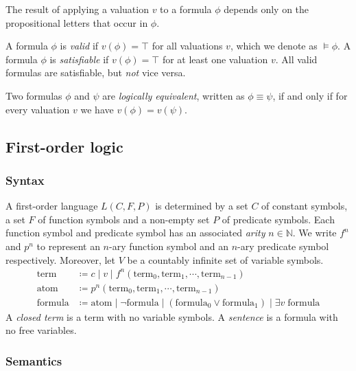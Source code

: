 The result of applying a valuation \(v\) to a formula \(\phi\) depends only on the propositional letters that occur in \(\phi\). 

A formula \(\phi\) is \emph{valid} if \(v(\phi) = \top\) for all valuations \(v\), which we denote as \(\models \phi\). A formula \(\phi\) is \emph{satisfiable} if \(v(\phi) = \top\) for at least one valuation \(v\). All valid formulas are satisfiable, but \emph{not} vice versa.

Two formulas \(\phi\) and \(\psi\) are \emph{logically equivalent}, written as \(\phi \equiv \psi\), if and only if for every valuation \(v\) we have \(v(\phi) = v(\psi)\).



\subsection{First-order logic}

\subsubsection{Syntax}

A first-order language \(L(C, F, P)\) is determined by a set \(C\) of constant symbols, a set \(F\) of function symbols and a non-empty set \(P\) of predicate symbols. Each function symbol and predicate symbol has an associated \emph{arity} \(n \in \mathbb{N}\). We write \(f^n\) and \(p^n\) to represent an \(n\)-ary function symbol and an \(n\)-ary predicate symbol respectively. Moreover, let \(V\) be a countably infinite set of variable symbols.
%
\begin{align*}
    \text{term} &\coloneq c \;\vert\; v \;\vert\; f^n (\text{term}_0, \text{term}_1, \cdots, \text{term}_{n-1}) \tag{where \(c \in C\), \(v \in V\) and \(f^n \in F\)}\\
    \text{atom} &\coloneq p^n (\text{term}_0, \text{term}_1, \cdots, \text{term}_{n-1}) \tag{where \(p^n \in P\)}\\
    \text{formula} &\coloneq \text{atom} \;\vert\; \neg \text{formula} \;\vert\; (\text{formula}_0 \lor \text{formula}_1) \;\vert\; \exists v\; \text{formula}  \tag{where \(v \in V\)}
\end{align*}
%
A \emph{closed term} is a term with no variable symbols. A \emph{sentence} is a formula with no free variables.



\subsubsection{Semantics}

